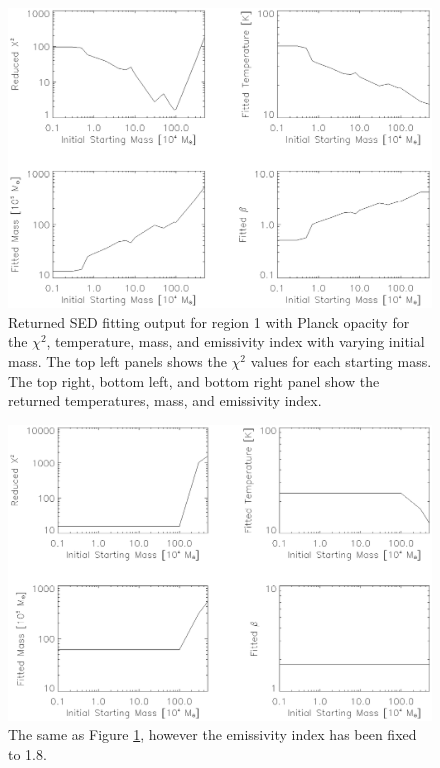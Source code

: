 \begin{figure}
  \centering
  \includegraphics[width=1.\textwidth]{sed_imgs/beta_f_return.eps}
  \caption[Initial Mass Dependence and Convergence of SED Fits for Region Fluxes and Variable Emissivity Index]{Returned SED fitting output for region 1 with Planck opacity for the $\chi^2$, temperature, mass, and emissivity index with varying initial mass.  The top left panels shows the $\chi^2$ values for each starting mass.  The top right, bottom left, and bottom right panel show the returned temperatures, mass, and emissivity index.}
  \label{fig:init_mass_bf}
\end{figure}

\begin{figure}
  \centering
  \includegraphics[width=1.\textwidth]{sed_imgs/beta_1_return.eps}
  \caption[Initial Mass Dependence and Convergence of SED Fits for Region Fluxes and Fixed Emissivity Index]{The same as Figure \ref{fig:init_mass_bf}, however the emissivity index has been fixed to 1.8.}
  \label{fig:init_mass_b1}
\end{figure}

